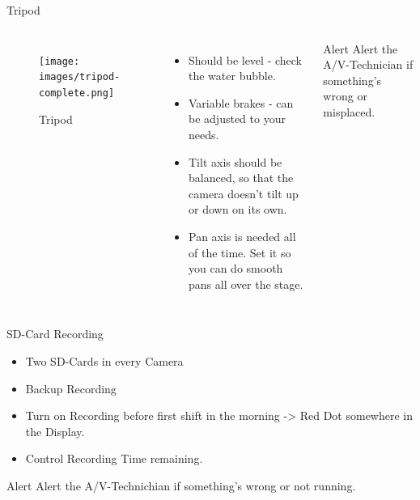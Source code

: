 \documentclass[aspectratio=169]{beamer}
\begin{document}
%

\begin{frame}{Tripod}
	\begin{columns}[T,onlytextwidth]
	\begin{figure} 
		\centering
		\texttt{[image: images/tripod-complete.png]}
		\caption{Tripod}
	\end{figure}
	
	\begin{itemize}
			\item Should be level - check the water bubble.
			\item Variable brakes - can be adjusted to your needs.
			\item Tilt axis should be balanced, so that the camera doesn't tilt up or down on its own.
			\item Pan axis is needed all of the time. Set it so you can do smooth pans all over the stage.
		\end{itemize}
		\begin{alertblock}{Alert}
			Alert the A/V-Technician if something's wrong or misplaced.
		\end{alertblock}
	\end{columns}
\end{frame}

\begin{frame}{SD-Card Recording}
		\begin{itemize}
			\item Two SD-Cards in every Camera
			\item Backup Recording
			\item Turn on Recording before first shift in the morning -> Red Dot somewhere in the Display.
			\item Control Recording Time remaining. 
		\end{itemize}
		\begin{alertblock}{Alert}
			Alert the A/V-Technichian if something's wrong or not running.
		\end{alertblock}
\end{frame}
\end{document}
